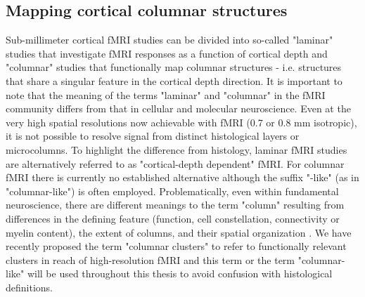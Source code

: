 \subsection{Mapping cortical columnar structures}
Sub-millimeter cortical fMRI studies can be divided into so-called "laminar" studies that investigate fMRI responses as a function of cortical depth and "columnar" studies that functionally map columnar structures - i.e. structures that share a singular feature in the cortical depth direction. It is important to note that the meaning of the terms "laminar" and "columnar" in the fMRI community differs from that in cellular and molecular neuroscience. Even at the very high spatial resolutions now achievable with fMRI (0.7 or 0.8 mm isotropic), it is not possible to resolve signal from distinct histological layers or microcolumns. To highlight the difference from histology, laminar fMRI studies are alternatively referred to as "cortical-depth dependent" fMRI. For columnar fMRI there is currently no established alternative although the suffix "-like" (as in "columnar-like") is often employed. Problematically, even within fundamental neuroscience, there are different meanings to the term "column" resulting from differences in the defining feature (function, cell constellation, connectivity or myelin content), the extent of columns, and their spatial organization \parencite{Rakic2008}. We have recently proposed the term "columnar clusters" to refer to functionally relevant clusters in reach of high-resolution fMRI \parencite{Schneider2019} and this term or the term "columnar-like" will be used throughout this thesis to avoid confusion with histological definitions.

